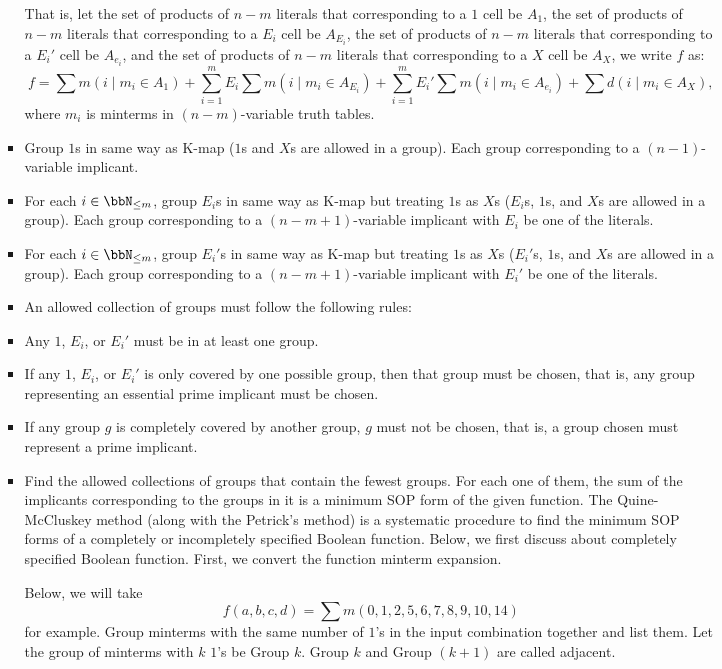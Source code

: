 \documentclass[a4paper,12pt]{article}
\begin{document}
\begin{itemize}
\begin{itemize}
\begin{itemize}
\begin{itemize}
\begin{itemize}
\begin{itemize}
\begin{itemize}
\eit
That is, let the set of products of $n-m$ literals that corresponding to a $1$ cell be $A_1$, the set of products of $n-m$ literals that corresponding to a $E_i$ cell be $A_{E_i}$, the set of products of $n-m$ literals that corresponding to a $E_i'$ cell be $A_{e_i}$, and the set of products of $n-m$ literals that corresponding to a $X$ cell be $A_X$, we write $f$ as:
\[f=\sum m(i\mid m_i\in A_1)+\sum_{i=1}^mE_i\sum m(i\mid m_i\in A_{E_i})+\sum_{i=1}^mE_i'\sum m(i\mid m_i\in A_{e_i})+\sum d(i\mid m_i\in A_X),\]
where $m_i$ is minterms in $(n-m)$-variable truth tables.
\item Group $1$s in same way as K-map ($1$s and $X$s are allowed in a group). Each group corresponding to a $(n-1)$-variable implicant.
\item For each $i\in\bbN_{\leq m}$, group $E_i$s in same way as K-map but treating $1$s as $X$s ($E_i$s, $1$s, and $X$s are allowed in a group). Each group corresponding to a $(n-m+1)$-variable implicant with $E_i$ be one of the literals.
\item For each $i\in\bbN_{\leq m}$, group $E_i'$s in same way as K-map but treating $1$s as $X$s ($E_i'$s, $1$s, and $X$s are allowed in a group). Each group corresponding to a $(n-m+1)$-variable implicant with $E_i'$ be one of the literals.
\item An allowed collection of groups must follow the following rules:
\bit
\item Any $1$, $E_i$, or $E_i'$ must be in at least one group.
\item If any $1$, $E_i$, or $E_i'$ is only covered by one possible group, then that group must be chosen, that is, any group representing an essential prime implicant must be chosen.
\item If any group $g$ is completely covered by another group, $g$ must not be chosen, that is, a group chosen must represent a prime implicant.
\eit
\item Find the allowed collections of groups that contain the fewest groups. For each one of them, the sum of the implicants corresponding to the groups in it is a minimum SOP form of the given function.
\een
{}
The Quine-McCluskey method (along with the Petrick's method) is a systematic procedure to find the minimum SOP forms of a completely or incompletely specified Boolean function. Below, we first discuss about completely specified Boolean function.
First, we convert the function minterm expansion.

Below, we will take
\[f(a,b,c,d)=\sum m(0,1,2,5,6,7,8,9,10,14)\]
for example.
Group minterms with the same number of $1$'s in the input combination together and list them. Let the group of minterms with $k$ $1$'s be Group $k$. Group $k$ and Group $(k+1)$ are called adjacent.


\end{itemize}
\end{itemize}
\end{itemize}
\end{itemize}
\end{itemize}
\end{itemize}
\end{itemize}
\end{document}
